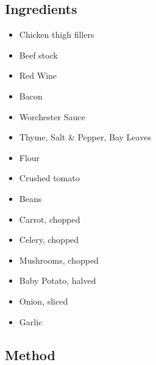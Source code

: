 \documentclass[11pt,a4paper]{article}
\begin{document}
\subsection*{Ingredients}

\begin{multicols}{2}

\begin{itemize}
  \item Chicken thigh fillers
  \item Beef stock
  \item Red Wine
  \item Bacon
  \item Worchester Sauce
  \item Thyme, Salt \& Pepper, Bay Leaves
  \item Flour
  \item Crushed tomato
\end{itemize}

\columnbreak

\begin{itemize}
  \item Beans
  \item Carrot, chopped
  \item Celery, chopped
  \item Mushrooms, chopped
  \item Baby Potato, halved
  \item Onion, sliced
  \item Garlic
\end{itemize}

\end{multicols}

\medskip

\subsection*{Method}
\end{document}
